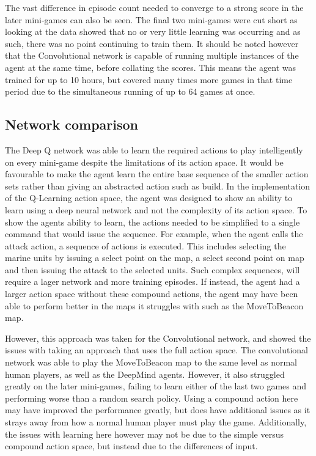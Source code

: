The vast difference in episode count needed to converge to a strong score in the
later mini-games can also be seen. The final two mini-games were cut short as
looking at the data showed that no or very little learning was occurring and as
such, there was no point continuing to train them. It should be noted however
that the Convolutional network is capable of running multiple instances of the
agent at the same time, before collating the scores. This means the agent was
trained for up to 10 hours, but covered many times more games in that time
period due to the simultaneous running of up to 64 games at once.

\subsection{Network comparison}

The Deep Q network was able to learn the required actions to play intelligently
on every mini-game despite the limitations of its action space. It would be
favourable to make the agent learn the entire base sequence of the smaller
action sets rather than giving an abstracted action such as build. In the
implementation of the Q-Learning action space, the agent was designed to show an
ability to learn using a deep neural network and not the complexity of its
action space. To show the agents ability to learn, the actions needed to be
simplified to a single command that would issue the sequence. For example, when
the agent calls the attack action, a sequence of actions is executed. This
includes selecting the marine units by issuing a select point on the map, a
select second point on map and then issuing the attack to the selected units.
Such complex sequences, will require a lager network and more training episodes.
If instead, the agent had a larger action space without these compound actions,
the agent may have been able to perform better in the maps it struggles with
such as the MoveToBeacon map.

However, this approach was taken for the Convolutional network, and showed the
issues with taking an approach that uses the full action space. The
convolutional network was able to play the MoveToBeacon map to the same level as
normal human players, as well as the DeepMind agents. However, it also struggled
greatly on the later mini-games, failing to learn either of the last two games
and performing worse than a random search policy. Using a compound action here
may have improved the performance greatly, but does have additional issues as it
strays away from how a normal human player must play the game. Additionally,
the issues with learning here however may not be due to the simple versus
compound action space, but instead due to the differences of input.

